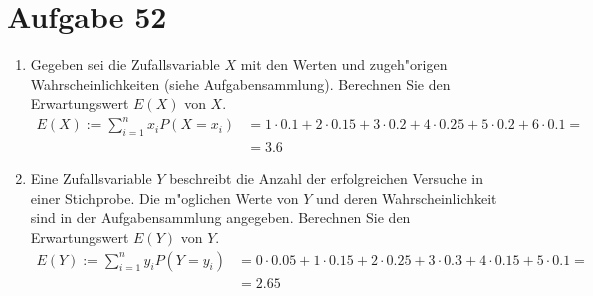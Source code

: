\section{Aufgabe 52}
\setcounter{section}{52}

\begin{enumerate}
    \item Gegeben sei die Zufallsvariable $X$ mit den Werten und zugeh"origen Wahrscheinlichkeiten (siehe Aufgabensammlung).
        Berechnen Sie den Erwartungswert $E(X)$ von $X$.
        \begin{align*}
            E(X) := \sum_{i = 1}^n x_iP(X = x_i) &= 1 \cdot 0.1 + 2 \cdot 0.15 + 3 \cdot 0.2 + 4 \cdot 0.25 + 5 \cdot 0.2 + 6 \cdot 0.1 = \\
                                                 &= 3.6
        \end{align*}
    \item Eine Zufallsvariable $Y$ beschreibt die Anzahl der erfolgreichen
        Versuche in einer Stichprobe. Die m"oglichen Werte von $Y$ und deren
        Wahrscheinlichkeit sind in der Aufgabensammlung angegeben.
        Berechnen Sie den Erwartungswert $E(Y)$ von $Y$.
        \begin{align*}
            E(Y) := \sum_{i = 1}^n y_iP(Y = y_i) &= 0 \cdot 0.05 + 1 \cdot 0.15 + 2 \cdot 0.25 + 3 \cdot 0.3 + 4 \cdot 0.15 + 5 \cdot 0.1 = \\
                                                 &= 2.65
        \end{align*}
\end{enumerate}
